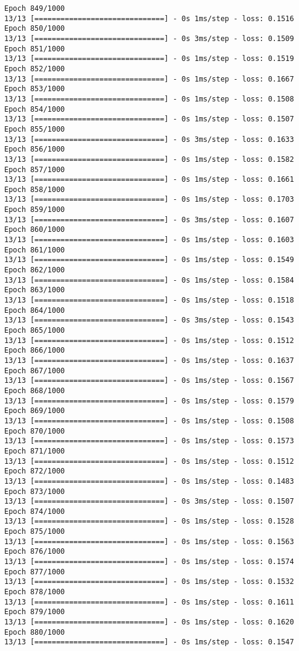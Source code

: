 \documentclass[11pt]{article}
\begin{document}
\begin{Verbatim}[commandchars=\\\{\}]
Epoch 849/1000
13/13 [==============================] - 0s 1ms/step - loss: 0.1516
Epoch 850/1000
13/13 [==============================] - 0s 3ms/step - loss: 0.1509
Epoch 851/1000
13/13 [==============================] - 0s 1ms/step - loss: 0.1519
Epoch 852/1000
13/13 [==============================] - 0s 1ms/step - loss: 0.1667
Epoch 853/1000
13/13 [==============================] - 0s 1ms/step - loss: 0.1508
Epoch 854/1000
13/13 [==============================] - 0s 1ms/step - loss: 0.1507
Epoch 855/1000
13/13 [==============================] - 0s 3ms/step - loss: 0.1633
Epoch 856/1000
13/13 [==============================] - 0s 1ms/step - loss: 0.1582
Epoch 857/1000
13/13 [==============================] - 0s 1ms/step - loss: 0.1661
Epoch 858/1000
13/13 [==============================] - 0s 1ms/step - loss: 0.1703
Epoch 859/1000
13/13 [==============================] - 0s 3ms/step - loss: 0.1607
Epoch 860/1000
13/13 [==============================] - 0s 1ms/step - loss: 0.1603
Epoch 861/1000
13/13 [==============================] - 0s 1ms/step - loss: 0.1549
Epoch 862/1000
13/13 [==============================] - 0s 1ms/step - loss: 0.1584
Epoch 863/1000
13/13 [==============================] - 0s 1ms/step - loss: 0.1518
Epoch 864/1000
13/13 [==============================] - 0s 3ms/step - loss: 0.1543
Epoch 865/1000
13/13 [==============================] - 0s 1ms/step - loss: 0.1512
Epoch 866/1000
13/13 [==============================] - 0s 1ms/step - loss: 0.1637
Epoch 867/1000
13/13 [==============================] - 0s 1ms/step - loss: 0.1567
Epoch 868/1000
13/13 [==============================] - 0s 1ms/step - loss: 0.1579
Epoch 869/1000
13/13 [==============================] - 0s 1ms/step - loss: 0.1508
Epoch 870/1000
13/13 [==============================] - 0s 1ms/step - loss: 0.1573
Epoch 871/1000
13/13 [==============================] - 0s 1ms/step - loss: 0.1512
Epoch 872/1000
13/13 [==============================] - 0s 1ms/step - loss: 0.1483
Epoch 873/1000
13/13 [==============================] - 0s 3ms/step - loss: 0.1507
Epoch 874/1000
13/13 [==============================] - 0s 1ms/step - loss: 0.1528
Epoch 875/1000
13/13 [==============================] - 0s 1ms/step - loss: 0.1563
Epoch 876/1000
13/13 [==============================] - 0s 1ms/step - loss: 0.1574
Epoch 877/1000
13/13 [==============================] - 0s 1ms/step - loss: 0.1532
Epoch 878/1000
13/13 [==============================] - 0s 1ms/step - loss: 0.1611
Epoch 879/1000
13/13 [==============================] - 0s 1ms/step - loss: 0.1620
Epoch 880/1000
13/13 [==============================] - 0s 1ms/step - loss: 0.1547

\end{Verbatim}
\end{document}
